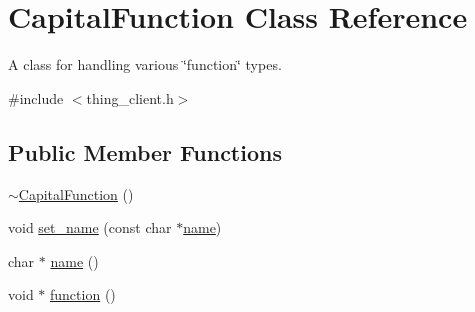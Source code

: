 \hypertarget{classCapitalFunction}{\section{Capital\-Function Class Reference}
\label{classCapitalFunction}
}


A class for handling various \char`\"{}function\char`\"{} types.  




{\ttfamily \#include $<$thing\-\_\-client.\-h$>$}

\subsection*{Public Member Functions}
\begin{DoxyCompactItemize}
\item 
\hyperlink{classCapitalFunction_aa2b99fd29c519f475e5fe06eac460f9a}{$\sim$\-Capital\-Function} ()
\item 
void \hyperlink{classCapitalFunction_a8f5f8a9b32b18c806bb9b33dd355ec86}{set\-\_\-name} (const char $\ast$\hyperlink{classCapitalFunction_af492834dfd92eb02e0c0bf915fc58755}{name})
\item 
char $\ast$ \hyperlink{classCapitalFunction_af492834dfd92eb02e0c0bf915fc58755}{name} ()
\item 
void $\ast$ \hyperlink{classCapitalFunction_a402a1c3915165656da3fbf1636777da0}{function} ()
\end{DoxyCompactItemize}
